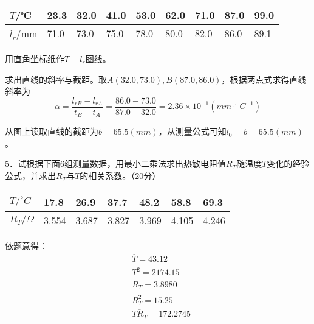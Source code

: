 \documentclass[UTF-8, a4paper, 12pt]{ctexart}
\begin{document}
  \begin{longtable}[]{@{}lllllllll@{}}
    \toprule
    $T$/℃ & 23.3 & 32.0 & 41.0 & 53.0 & 62.0 & 71.0 & 87.0 & 99.0 \\
    \midrule
    \endhead
    $l_r$/mm& 71.0 & 73.0 & 75.0 & 78.0 & 80.0 & 82.0 & 86.0 & 89.1 \\
    \bottomrule
  \end{longtable}

  用直角坐标纸作$T-l_r$图线。

  \begin{center}
  \end{center}

  求出直线的斜率与截距。取$A(32.0, 73.0),B(87.0, 86.0)$，根据两点式求得直线斜率为$$\alpha = \frac{l_{rB} - l_{rA}}{t_B - t_A} = \frac{86.0 - 73.0}{87.0 - 32.0} = 2.36 \times 10^{-1}(mm \cdot ^{\circ}C^{-1})$$

  从图上读取直线的截距为$b=65.5(mm)$，从测量公式可知$l_0 = b = 65.5(mm)$。

  5．试根据下面6组测量数据，用最小二乘法求出热敏电阻值$R_T$随温度$T$变化的经验公式，并求出$R_T$与$T$的相关系数。（20分）

  \begin{longtable}[]{@{}lllllll@{}}
    \toprule
    $T/^\circ C$ & 17.8 & 26.9 & 37.7 & 48.2 & 58.8 & 69.3 \\
    \midrule
    \endhead
    $R_T/\Omega$& 3.554 & 3.687 & 3.827 & 3.969 & 4.105 & 4.246 \\
    \bottomrule
  \end{longtable}

  依题意得：$$\begin{array}{ll}
    &\overline T = 43.12 \\
    &\overline{T^2} = 2174.15 \\
    &\overline{R_T} = 3.8980 \\
    &\overline{R_T^2} = 15.25 \\
    &\overline{TR_T} = 172.2745 \\
  \end{array}$$
\end{document}
